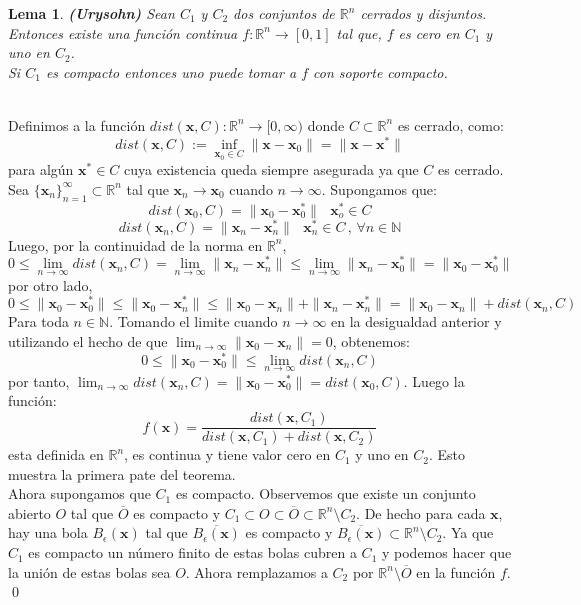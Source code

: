 \documentclass[12pt]{book}
\numberwithin{equation}{chapter}
\newtheorem{lemma}[theorem]{Lema}
\def\n{\noindent}
\def\ol{\overline}
\def\R{\mathbb{R}}
\def\rar{\rightarrow}
\def\x{\mathbf{x}}
\begin{document}
\begin{lemma}
{\bf (Urysohn)} Sean $C_{1}$ y $C_{2}$ dos conjuntos de $\R^{n}$ cerrados y disjuntos. Entonces existe una funci\'on continua $f: \R^{n} \rar [0,1]$ tal que, $f$  es cero en $C_{1}$ y uno en $C_{2}$.\\
Si $C_{1}$ es compacto entonces uno puede tomar a $f$ con soporte compacto.  
\end{lemma}
\n {\bf Demostraci\'on}\\
Definimos a la funci\'on $dist(\x,C): \R^{n} \rar [0,\infty)$ donde $C \subset \R^{n}$ es cerrado, como:
$$ dist(\x,C):= \inf_{\x_{0} \in C} \|\x- \x_{0} \|= \| \x - \x^{*} \| $$  
para alg\'un $\x^{*} \in C$ cuya existencia queda siempre asegurada ya que $C$ es cerrado. Sea $\{\x_{n}\}_{n=1}^{\infty} \subset \R^{n} $ tal que $\x_{n} \rar \x_{0}$ cuando $n \rar \infty$. Supongamos que:
$$ dist(\x_{0},C)= \| \x_{0} - \x_{0}^{*} \| \,\,\,\, \x_{o}^{*} \in C $$
$$ dist(\x_{n},C)= \| \x_{n} - \x_{n}^{*} \| \,\,\,\, \x_{n}^{*} \in C \,,\, \forall n \in \mathbb{N} $$ 
Luego, por la continuidad de la norma en $\R^{n}$,
$$ 0 \leq \lim_{n \rar \infty} dist(\x_{n},C) = \lim_{n \rar \infty} \| \x_{n}-\x_{n}^{*} \| \leq \lim_{n \rar \infty} \| \x_{n}-\x_{0}^{*} \| = \|\x_{0}-\x_{0}^{*} \| $$
por otro lado,
$$ 0 \leq \| \x_{0}-\x_{0}^{*} \| \leq \| \x_{0}-\x_{n}^{*} \| \leq \|\x_{0}-\x_{n}\| + \| \x_{n}-\x_{n}^{*} \| = \|\x_{0}-\x_{n}\| + dist(\x_{n},C) $$
Para toda $n \in \mathbb{N}$. Tomando el limite cuando $n \rar \infty$ en la desigualdad anterior y utilizando el hecho de que $\lim_{n \rar \infty} \|\x_{0}-\x_{n}\| =0 $, obtenemos:
$$ 0 \leq \| \x_{0}-\x_{0}^{*} \| \leq \lim_{n \rar \infty} dist(\x_{n},C) $$
por tanto, $ \lim_{n \rar \infty} dist(\x_{n},C)=\| \x_{0}-\x_{0}^{*} \|= dist(\x_{0},C) $. Luego la funci\'on:
$$ f(\x)= \frac{ dist(\x,C_{1}) }{ dist(\x,C_{1})+dist(\x,C_{2}) } $$
esta definida en $\R^{n}$, es continua y tiene valor cero en $C_{1}$ y uno en $C_{2}$. Esto muestra la primera pate del teorema.\\

Ahora supongamos que $C_{1}$ es compacto. Observemos que existe un conjunto abierto $O$ tal que $\ol{O}$ es compacto y $C_{1} \subset O \subset \ol{O} \subset \R^{n} \setminus C_{2}$. De hecho para cada $\x$, hay una bola $B_{\epsilon}(\x)$ tal que $\ol{B_{\epsilon}(\x)}$ es compacto y $ \ol{B_{\epsilon}(\x)} \subset \R^{n} \setminus C_{2} $. Ya que $C_{1}$ es compacto un n\'umero finito de estas bolas cubren a $C_{1}$ y podemos hacer que la uni\'on de estas bolas sea $O$. Ahora remplazamos a $C_{2}$ por $\R^{n} \setminus \ol{O}$ en la funci\'on $f$.  \\ \qed
\end{document}

